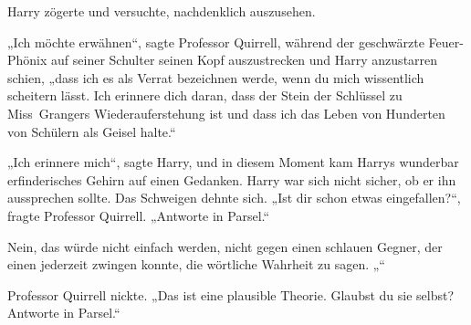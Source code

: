 Harry zögerte und versuchte, nachdenklich auszusehen.

„Ich möchte erwähnen“, sagte Professor Quirrell, während der geschwärzte Feuer-Phönix auf seiner Schulter seinen Kopf auszustrecken und Harry anzustarren schien,
„dass ich es als Verrat bezeichnen werde, wenn du mich wissentlich scheitern lässt. Ich erinnere dich daran, dass der Stein der Schlüssel zu Miss~Grangers Wiederauferstehung ist und dass ich das Leben von Hunderten von Schülern als Geisel halte.“

„Ich erinnere mich“, sagte Harry, und in diesem Moment kam Harrys wunderbar erfinderisches Gehirn auf einen Gedanken.
Harry war sich nicht sicher, ob er ihn aussprechen sollte.
Das Schweigen dehnte sich.
„Ist dir schon etwas eingefallen?“, fragte Professor Quirrell. „Antworte in Parsel.“

Nein, das würde nicht einfach werden, nicht gegen einen schlauen Gegner, der einen jederzeit zwingen konnte, die wörtliche Wahrheit zu sagen.
„“

Professor Quirrell nickte.
„Das ist eine plausible Theorie. Glaubst du sie selbst? Antworte in Parsel.“

